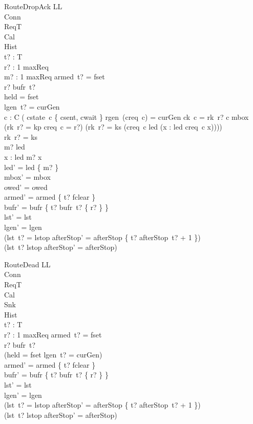 \documentclass[a4paper,10pt,fleqn]{article}
\begin{document}
\begin{schema}{RouteDropAck}
  \Delta LL \\
  \Xi Conn \\
  \Xi ReqT \\
  \Xi Cal \\
  \Xi Hist \\
  t? : T \\
  r? : 1 \upto maxReq \\
  m? : 1 \upto maxReq
\where
  armed~t? = fset \\
  r? \in bufr~t? \\
  held = fset \\
  lgen~t? = curGen \\
  \forall c : C \spot \lnot ( cstate~c \in \{ csent, cwait \}
    \land rgen~(creq~c) = curGen \land ck~c = rk~r? \land c \notin \dom mbox
    \land (rk~r? = kp \implies creq~c = r?)
    \land (rk~r? = ks \implies
      (creq~c \in led \land (\forall x : led \spot creq~c \leq x)))) \\
  rk~r? = ks \\
  m? \in led \\
  \forall x : led \spot m? \leq x \\
  led' = led \setminus \{ m? \} \\
  mbox' = mbox \\
  owed' = owed \\
  armed' = armed \oplus \{ t? \mapsto fclear \} \\
  bufr' = bufr \oplus \{ t? \mapsto bufr~t? \setminus \{ r? \} \} \\
  lst' = lst \\
  lgen' = lgen \\
  (lst~t? = lstop \implies
    afterStop' = afterStop \oplus \{ t? \mapsto afterStop~t? + 1 \}) \\
  (lst~t? \neq lstop \implies afterStop' = afterStop)
\end{schema}

\begin{schema}{RouteDead}
  \Delta LL \\
  \Xi Conn \\
  \Xi ReqT \\
  \Xi Cal \\
  \Xi Snk \\
  \Xi Hist \\
  t? : T \\
  r? : 1 \upto maxReq
\where
  armed~t? = fset \\
  r? \in bufr~t? \\
  \lnot (held = fset \land lgen~t? = curGen) \\
  armed' = armed \oplus \{ t? \mapsto fclear \} \\
  bufr' = bufr \oplus \{ t? \mapsto bufr~t? \setminus \{ r? \} \} \\
  lst' = lst \\
  lgen' = lgen \\
  (lst~t? = lstop \implies
    afterStop' = afterStop \oplus \{ t? \mapsto afterStop~t? + 1 \}) \\
  (lst~t? \neq lstop \implies afterStop' = afterStop)
\end{schema}
\end{document}

